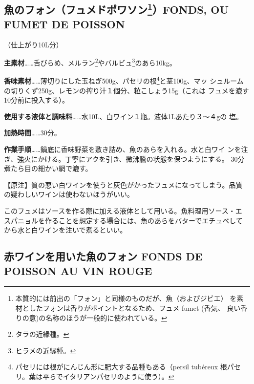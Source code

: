 \documentclass[twoside,12Q,b5paper]{escoffierltjsbook}
\begin{document}
\subsection*{\texorpdfstring{魚のフォン（フュメドポワソン\footnote{本質的には前出の「フォン」と同様のものだが、魚（およびジビエ）
  を素材としたフォンは香りがポイントとなるため、フュメ fumet (香気、
  良い香りの意)の名称のほうが一般的に使われている。}）FONDS, OU FUMET DE
POISSON}{魚のフォン（フュメドポワソン）FONDS, OU FUMET DE POISSON}}\label{ux9b5aux306eux30d5ux30a9ux30f3ux30d5ux30e5ux30e1ux30c9ux30ddux30efux30bdux30f313fonds-ou-fumet-de-poisson}

（仕上がり10L分）

\textbf{主素材}\ldots{}\ldots{}舌びらめ、メルラン\footnote{タラの近縁種。}やバルビュ\footnote{ヒラメの近縁種。}のあら10kg。

\textbf{香味素材}\ldots{}\ldots{}薄切りにした玉ねぎ500g、パセリの根\footnote{パセリには根がにんじん形に肥大する品種もある（persil
  tubéreux 根パセリ。葉は平らでイタリアンパセリのように使う）。}と茎100g、マッ
シュルームの切りくず250g、レモンの搾り汁１個分、粒こしょう15g（これは
フュメを漉す10分前に投入する）。

\textbf{使用する液体と調味料}\ldots{}\ldots{}水10L、白ワイン１瓶。液体1Lあたり３〜４gの
塩。

\textbf{加熱時間}\ldots{}\ldots{}30分。

\textbf{作業手順}\ldots{}\ldots{}鍋底に香味野菜を敷き詰め、魚のあらを入れる。水と白ワイ
ンを注ぎ、強火にかける。丁寧にアクを引き、微沸騰の状態を保つようにする。
30分煮たら目の細かい網で漉す。

【原注】質の悪い白ワインを使うと灰色がかったフュメになってしまう。品質
の疑わしいワインは使わないほうがいい。

このフュメはソースを作る際に加える液体として用いる。魚料理用ソース・エ
スパニョルを作ることを想定する場合には、魚のあらをバターでエチュベして
から水と白ワインを注いで煮るといい。

\subsection*{赤ワインを用いた魚のフォン FONDS DE POISSON AU VIN
ROUGE}\label{ux8d64ux30efux30a4ux30f3ux3092ux7528ux3044ux305fux9b5aux306eux30d5ux30a9ux30f3-fonds-de-poisson-au-vin-rouge}
\end{document}
